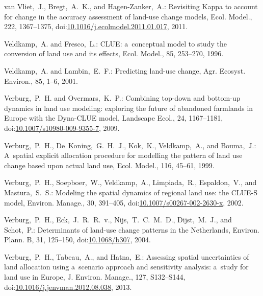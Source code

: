 \documentclass[gmdd, online, hvmath]{copernicus}
\begin{document}
\begin{thebibliography}{97}
 van Vliet,~J., Bregt,~A.~K., and
  {Hagen-Zanker},~A.: Revisiting Kappa to account for change in the
  accuracy assessment of land-use change models, Ecol. Model., 222,
  1367--1375,
doi:\href{http://dx.doi.org/10.1016/j.ecolmodel.2011.01.017}{10.1016/j.ecolmodel.2011.01.017}, 2011.


 Veldkamp,~A. and
  Fresco,~L.: CLUE: a~conceptual model to study the conversion of land
  use and its effects, Ecol. Model., 85, 253--270, 1996. %


 Veldkamp,~A. and
  Lambin,~E.~F.: Predicting land-use change, Agr. Ecosyst. Environ.,
  85, 1--6, 2001. %


 Verburg,~P.~H. and
  Overmars,~K.~P.: Combining top-down and bottom-up dynamics in land
  use modeling: exploring the future of abandoned farmlands in Europe
  with the {Dyna-CLUE} model, Landscape Ecol., 24, 1167--1181,
  doi:\href{http://dx.doi.org/10.1007/s10980-009-9355-7}{10.1007/s10980-009-9355-7}, 2009. %


 Verburg,~P.~H., De~Koning,~G.~H.~J., Kok,~K.,
  Veldkamp,~A., and Bouma,~J.: A~spatial explicit allocation procedure
  for modelling the pattern of land use change based upon actual land
  use, Ecol. Model., 116, 45--61, 1999.


 Verburg,~P.~H., Soepboer,~W.,
  Veldkamp,~A., Limpiada,~R., Espaldon,~V., and Mastura,~S.~S.:
  Modeling the spatial dynamics of regional land use: the {CLUE-S}
  model, Environ. Manage., 30, 391--405,
  doi:\href{http://dx.doi.org/10.1007/s00267-002-2630-x}{10.1007/s00267-002-2630-x}, 2002.


 Verburg,~P.~H., Eck,~J.~R.~R.~v.,
  Nijs,~T.~C.~M.~D., Dijst,~M.~J., and Schot,~P.: Determinants of
  land-use change patterns in the Netherlands, Environ. Plann. B, 31,
  125--150,
doi:\href{http://dx.doi.org/10.1068/b307}{10.1068/b307}, 2004.


 Verburg,~P.~H., Tabeau,~A., and Hatna,~E.:
  Assessing spatial uncertainties of land allocation using a~scenario
  approach and sensitivity analysis: a~study for land use in Europe,
  J. Environ. Manage., 127, S132--S144,
  doi:\href{http://dx.doi.org/10.1016/j.jenvman.2012.08.038}{10.1016/j.jenvman.2012.08.038}, 2013.



\end{thebibliography}
\end{document}
